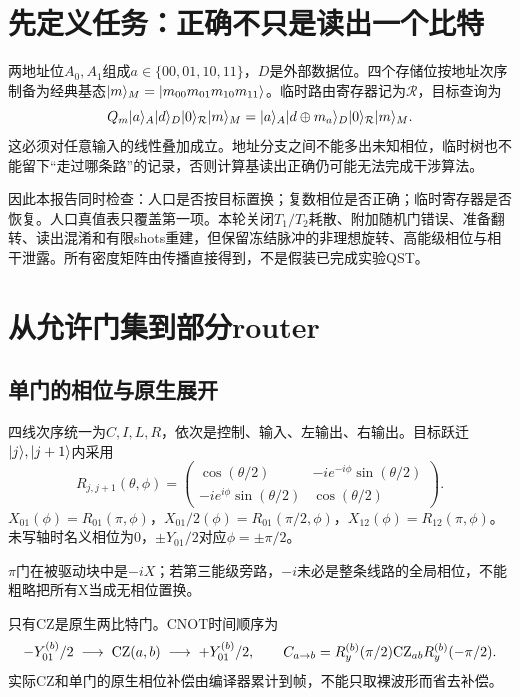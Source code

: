 \section{先定义任务：正确不只是读出一个比特}\label{sec:task}
两地址位$A_0,A_1$组成$a\in\{00,01,10,11\}$，$D$是外部数据位。四个存储位按地址次序制备为经典基态$\lvert m\rangle_M=\lvert m_{00}m_{01}m_{10}m_{11}\rangle$。临时路由寄存器记为$\mathcal R$，目标查询为
\begin{equation}\label{eq:querygoal}
 Q_m\lvert a\rangle_A\lvert d\rangle_D\lvert 0\rangle_{\mathcal R}\lvert m\rangle_M
 =\lvert a\rangle_A\lvert d\oplus m_a\rangle_D\lvert 0\rangle_{\mathcal R}\lvert m\rangle_M.
\end{equation}
这必须对任意输入的线性叠加成立。地址分支之间不能多出未知相位，临时树也不能留下“走过哪条路”的记录，否则计算基读出正确仍可能无法完成干涉算法。

因此本报告同时检查：人口是否按目标置换；复数相位是否正确；临时寄存器是否恢复。人口真值表只覆盖第一项。本轮关闭$T_1/T_2$耗散、附加随机门错误、准备翻转、读出混淆和有限shots重建，但保留冻结脉冲的非理想旋转、高能级相位与相干泄露。所有密度矩阵由传播直接得到，不是假装已完成实验QST。

\section{从允许门集到部分router}\label{sec:native}
\subsection{单门的相位与原生展开}
四线次序统一为$C,I,L,R$，依次是控制、输入、左输出、右输出。目标跃迁$\lvert j\rangle,\lvert j+1\rangle$内采用
\begin{equation}\label{eq:rotation}
 R_{j,j+1}(\theta,\phi)=\begin{pmatrix}
 \cos(\theta/2)&-i e^{-i\phi}\sin(\theta/2)\\
 -i e^{i\phi}\sin(\theta/2)&\cos(\theta/2)
 \end{pmatrix}.
\end{equation}
$X_{01}(\phi)=R_{01}(\pi,\phi)$，$X_{01}/2(\phi)=R_{01}(\pi/2,\phi)$，$X_{12}(\phi)=R_{12}(\pi,\phi)$。未写轴时名义相位为0，$\pm Y_{01}/2$对应$\phi=\pm\pi/2$。

$\pi$门在被驱动块中是$-iX$；若第三能级旁路，$-i$未必是整条线路的全局相位，不能粗略把所有X当成无相位置换。

只有CZ是原生两比特门。CNOT时间顺序为
\begin{equation}\label{eq:cnot}
 -Y_{01}^{(b)}/2\;\longrightarrow\;\mathrm{CZ}(a,b)\;\longrightarrow\;+Y_{01}^{(b)}/2,
 \qquad C_{a\to b}=R_y^{(b)}(\pi/2)\mathrm{CZ}_{ab}R_y^{(b)}(-\pi/2).
\end{equation}
实际CZ和单门的原生相位补偿由编译器累计到帧，不能只取裸波形而省去补偿。

